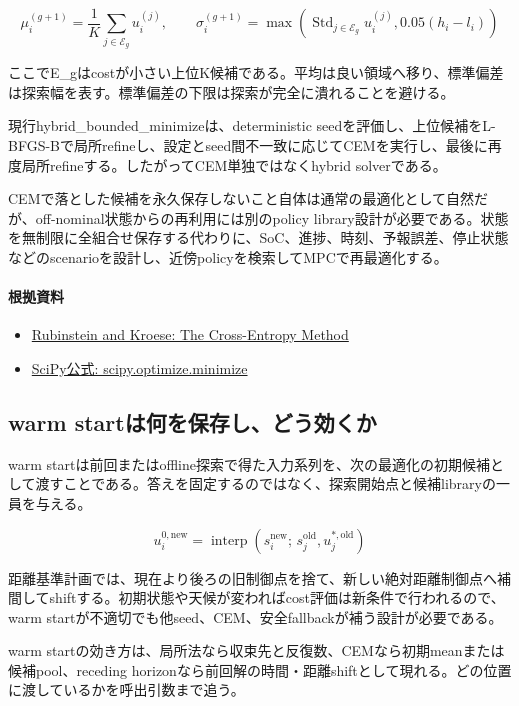 \documentclass[a4paper,11pt]{article}
\begin{document}
\[
\mu_i^{(g+1)}=\frac{1}{K}\sum_{j\in\mathcal{E}_g}u_i^{(j)},\qquad \sigma_i^{(g+1)}=\max\left(\operatorname{Std}_{j\in\mathcal{E}_g}u_i^{(j)},0.05(h_i-l_i)\right)
\]

ここでE\_gはcostが小さい上位K候補である。平均は良い領域へ移り、標準偏差は探索幅を表す。標準偏差の下限は探索が完全に潰れることを避ける。


現行hybrid\_bounded\_minimizeは、deterministic seedを評価し、上位候補をL-BFGS-Bで局所refineし、設定とseed間不一致に応じてCEMを実行し、最後に再度局所refineする。したがってCEM単独ではなくhybrid solverである。


CEMで落とした候補を永久保存しないこと自体は通常の最適化として自然だが、off-nominal状態からの再利用には別のpolicy library設計が必要である。状態を無制限に全組合せ保存する代わりに、SoC、進捗、時刻、予報誤差、停止状態などのscenarioを設計し、近傍policyを検索してMPCで再最適化する。

\paragraph{根拠資料}
\begin{itemize}[leftmargin=1.6em]
\item \href{https://link.springer.com/book/10.1007/978-1-4757-4321-0}{Rubinstein and Kroese: The Cross-Entropy Method}
\item \href{https://docs.scipy.org/doc/scipy/reference/generated/scipy.optimize.minimize.html}{SciPy公式: scipy.optimize.minimize}
\end{itemize}

\subsection{warm startは何を保存し、どう効くか}
warm startは前回またはoffline探索で得た入力系列を、次の最適化の初期候補として渡すことである。答えを固定するのではなく、探索開始点と候補libraryの一員を与える。


\[
u^{0,\mathrm{new}}_i=\operatorname{interp}\left(s_i^{\mathrm{new}};\,s_j^{\mathrm{old}},u_j^{\ast,\mathrm{old}}\right)
\]

距離基準計画では、現在より後ろの旧制御点を捨て、新しい絶対距離制御点へ補間してshiftする。初期状態や天候が変わればcost評価は新条件で行われるので、warm startが不適切でも他seed、CEM、安全fallbackが補う設計が必要である。


warm startの効き方は、局所法なら収束先と反復数、CEMなら初期meanまたは候補pool、receding horizonなら前回解の時間・距離shiftとして現れる。どの位置に渡しているかを呼出引数まで追う。
\end{document}
